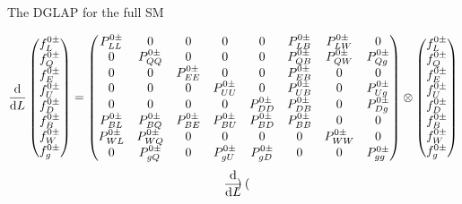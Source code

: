 \documentclass[aspectratio=169]{beamer}
\begin{document}
\begin{frame}{The DGLAP for the full SM}
	\vspace{-3mm}\begin{small}
	\begin{equation}\nonumber
	\frac{\dd }{\dd L}\begin{pmatrix}
	f_{L}^{0\pm}\\
	f_{Q}^{0\pm}\\
	f_{E}^{0\pm}\\
	f_{U}^{0\pm}\\
	f_{D}^{0\pm}\\
	f_{B}^{0\pm}\\
	f_{W}^{0\pm}\\
	f_{g}^{0\pm}
	\end{pmatrix}=
	\begin{pmatrix}
	P_{LL}^{0\pm} & 0 & 0 & 0 & 0 & P_{LB}^{0\pm} & P_{LW}^{0\pm} & 0 \\
	0 &  P_{QQ}^{0\pm} & 0 & 0 & 0 & P_{QB}^{0\pm} & P_{QW}^{0\pm} & P_{Qg}^{0\pm} \\
	0 & 0 & P_{EE}^{0\pm} & 0 & 0 & P_{EB}^{0\pm} & 0 & 0 \\
	0 & 0 & 0 & P_{UU}^{0\pm} & 0 & P_{UB}^{0\pm} & 0 & P_{Ug}^{0\pm} \\
	0 & 0 & 0 & 0 & P_{DD}^{0\pm} & P_{DB}^{0\pm} & 0 & P_{Dg}^{0\pm} \\
	P_{BL}^{0\pm} & P_{BQ}^{0\pm} & P_{BE}^{0\pm} & P_{BU}^{0\pm} & P_{BD}^{0\pm} & P_{BB}^{0\pm} & 0 & 0 \\
	P_{WL}^{0\pm} & P_{WQ}^{0\pm} & 0 & 0 & 0 & 0 & P_{WW}^{0\pm} & 0 \\
	0 & P_{gQ}^{0\pm} & 0 & P_{gU}^{0\pm} & P_{gD}^{0\pm} & 0 & 0 & P_{gg}^{0\pm} \\
	\end{pmatrix}
	\otimes
	\begin{pmatrix}
	f_{L}^{0\pm}\\
	f_{Q}^{0\pm}\\
	f_{E}^{0\pm}\\
	f_{U}^{0\pm}\\
	f_{D}^{0\pm}\\
	f_{B}^{0\pm}\\
	f_{W}^{0\pm}\\
	f_{g}^{0\pm}
	\end{pmatrix}
	\end{equation}
	\begin{equation}\nonumber
	\frac{\dd }{\dd L}\begin{pmatrix}

\end{pmatrix}
\end{equation}
\end{small}
\end{frame}
\end{document}
